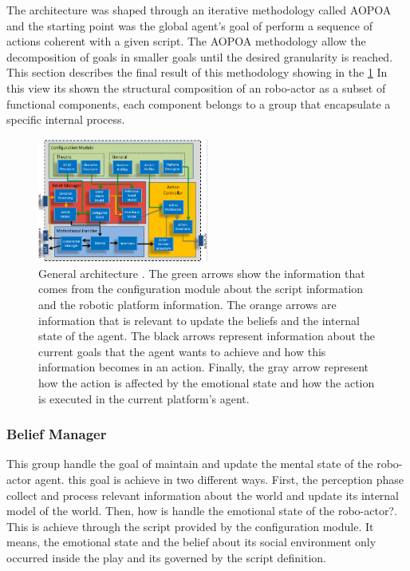  The architecture was shaped through an iterative methodology called AOPOA and the starting point was the global agent's goal of perform a sequence of actions coherent with a given script. The AOPOA methodology allow the decomposition of goals in smaller goals until the desired granularity is reached. This section describes the final result of this methodology showing in the \ref{fig:generalArchitecture} In this view its shown the structural composition of an robo-actor as a subset of functional components, each component belongs to a group that encapsulate a specific internal process.
 
 
\begin{figure}
	\centering
	\includegraphics[width=0.5\textwidth]{Images/GeneralArchitecture.png} 
	\caption{General architecture . The green arrows show the information that comes from the configuration module about the script information and the robotic platform information. The orange arrows are information that is relevant to update the beliefs and the internal state of the agent. The black arrows represent information about the current goals that the agent wants to achieve and how this information becomes in an action. Finally, the gray arrow represent how the action is affected by the emotional state and how the action is executed in the current platform's agent.}
	\label{fig:generalArchitecture}
\end{figure}


\subsubsection{Belief Manager}

This group handle the goal of maintain and update the mental state of the robo-actor agent. this goal is achieve in two different ways. First, the perception phase collect and process relevant information about the world and update its internal model of the world. Then, how is handle the emotional state of the robo-actor?. This is achieve through the script provided by the configuration module. It means, the emotional state and the belief about its social environment only occurred inside the play and its governed by the script definition.

